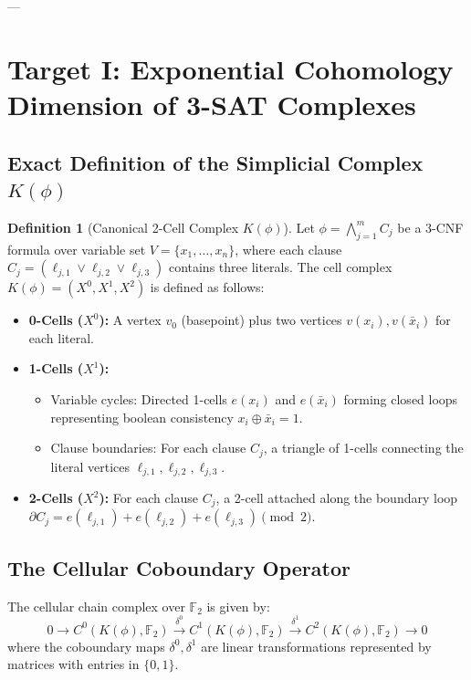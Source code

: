 \documentclass[11pt,a4paper]{article}
\theoremstyle{plain}
\theoremstyle{definition}
\newtheorem{definition}[theorem]{Definition}
\theoremstyle{remark}
\begin{document}
---

\section{Target I: Exponential Cohomology Dimension of 3-SAT Complexes}

\subsection{Exact Definition of the Simplicial Complex $K(\phi)$}

\begin{definition}[Canonical 2-Cell Complex $K(\phi)$]
Let $\phi = \bigwedge_{j=1}^m C_j$ be a 3-CNF formula over variable set $V = \{x_1, \dots, x_n\}$, where each clause $C_j = (\ell_{j,1} \lor \ell_{j,2} \lor \ell_{j,3})$ contains three literals. The cell complex $K(\phi) = (X^0, X^1, X^2)$ is defined as follows:
\begin{itemize}
    \item \textbf{0-Cells ($X^0$):} A vertex $v_0$ (basepoint) plus two vertices $v(x_i), v(\bar{x}_i)$ for each literal.
    \item \textbf{1-Cells ($X^1$):} 
    \begin{itemize}
        \item Variable cycles: Directed 1-cells $e(x_i)$ and $e(\bar{x}_i)$ forming closed loops representing boolean consistency $x_i \oplus \bar{x}_i = 1$.
        \item Clause boundaries: For each clause $C_j$, a triangle of 1-cells connecting the literal vertices $\ell_{j,1}, \ell_{j,2}, \ell_{j,3}$.
    \end{itemize}
    \item \textbf{2-Cells ($X^2$):} For each clause $C_j$, a 2-cell attached along the boundary loop $\partial C_j = e(\ell_{j,1}) + e(\ell_{j,2}) + e(\ell_{j,3}) \pmod 2$.
\end{itemize}
\end{definition}

\subsection{The Cellular Coboundary Operator}

The cellular chain complex over $\mathbb{F}_2$ is given by:
\[
0 \xrightarrow{} C^0(K(\phi), \mathbb{F}_2) \xrightarrow{\delta^0} C^1(K(\phi), \mathbb{F}_2) \xrightarrow{\delta^1} C^2(K(\phi), \mathbb{F}_2) \xrightarrow{} 0
\]
where the coboundary maps $\delta^0, \delta^1$ are linear transformations represented by matrices with entries in $\{0, 1\}$.
\end{document}

